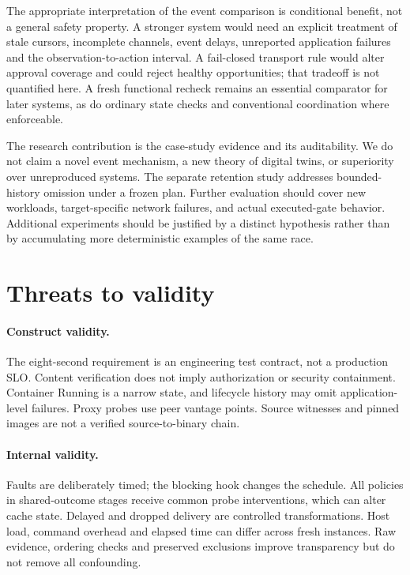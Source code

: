 \documentclass[manuscript,review,nonacm]{acmart}
\begin{document}
The appropriate interpretation of the event comparison is conditional benefit, not a general safety property. A stronger system would need an explicit treatment of stale cursors, incomplete channels, event delays, unreported application failures and the observation-to-action interval. A fail-closed transport rule would alter approval coverage and could reject healthy opportunities; that tradeoff is not quantified here. A fresh functional recheck remains an essential comparator for later systems, as do ordinary state checks and conventional coordination where enforceable.

The research contribution is the case-study evidence and its auditability. We do not claim a novel event mechanism, a new theory of digital twins, or superiority over unreproduced systems. The separate retention study addresses bounded-history omission under a frozen plan. Further evaluation should cover new workloads, target-specific network failures, and actual executed-gate behavior. Additional experiments should be justified by a distinct hypothesis rather than by accumulating more deterministic examples of the same race.

\section{Threats to validity}
\paragraph{Construct validity.} The eight-second requirement is an engineering test contract, not a production SLO. Content verification does not imply authorization or security containment. Container Running is a narrow state, and lifecycle history may omit application-level failures. Proxy probes use peer vantage points. Source witnesses and pinned images are not a verified source-to-binary chain.

\paragraph{Internal validity.} Faults are deliberately timed; the blocking hook changes the schedule. All policies in shared-outcome stages receive common probe interventions, which can alter cache state. Delayed and dropped delivery are controlled transformations. Host load, command overhead and elapsed time can differ across fresh instances. Raw evidence, ordering checks and preserved exclusions improve transparency but do not remove all confounding.
\end{document}
